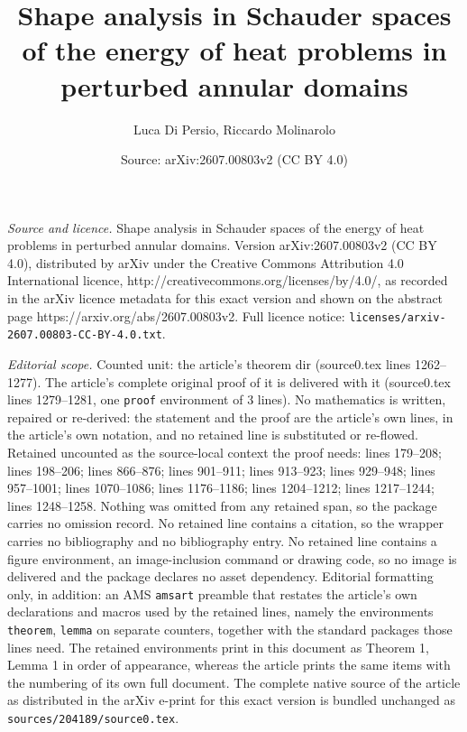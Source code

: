 \documentclass[10pt,a4paper]{amsart}
\title{Shape analysis in Schauder spaces of the energy of heat problems in perturbed annular domains}
\author{Luca Di Persio, Riccardo Molinarolo}
\date{Source: arXiv:2607.00803v2 (CC BY 4.0)}
\begin{document}
\maketitle

\noindent\emph{Source and licence.} Shape analysis in Schauder spaces of the energy of heat problems in perturbed annular domains. Version arXiv:2607.00803v2 (CC BY 4.0), distributed by arXiv under the Creative Commons Attribution 4.0 International licence, http://creativecommons.org/licenses/by/4.0/, as recorded in the arXiv licence metadata for this exact version and shown on the abstract page https://arxiv.org/abs/2607.00803v2. Full licence notice: \texttt{licenses/arxiv-2607.00803-CC-BY-4.0.txt}.\par\smallskip

\noindent\textit{Editorial scope.} Counted unit: the article's theorem dir (source0.tex lines 1262--1277). The article's complete original proof of it is delivered with it (source0.tex lines 1279--1281, one \texttt{proof} environment of 3 lines). No mathematics is written, repaired or re-derived: the statement and the proof are the article's own lines, in the article's own notation, and no retained line is substituted or re-flowed.  Retained uncounted as the source-local context the proof needs: lines 179--208; lines 198--206; lines 866--876; lines 901--911; lines 913--923; lines 929--948; lines 957--1001; lines 1070--1086; lines 1176--1186; lines 1204--1212; lines 1217--1244; lines 1248--1258.  Nothing was omitted from any retained span, so the package carries no omission record.  No retained line contains a citation, so the wrapper carries no bibliography and no bibliography entry.  No retained line contains a figure environment, an image-inclusion command or drawing code, so no image is delivered and the package declares no asset dependency.  Editorial formatting only, in addition: an AMS \texttt{amsart} preamble that restates the article's own declarations and macros used by the retained lines, namely the environments \texttt{theorem}, \texttt{lemma} on separate counters, together with the standard packages those lines need.  The retained environments print in this document as Theorem 1, Lemma 1 in order of appearance, whereas the article prints the same items with the numbering of its own full document.  The complete native source of the article as distributed in the arXiv e-print for this exact version is bundled unchanged as \texttt{sources/204189/source0.tex}.
\end{document}
